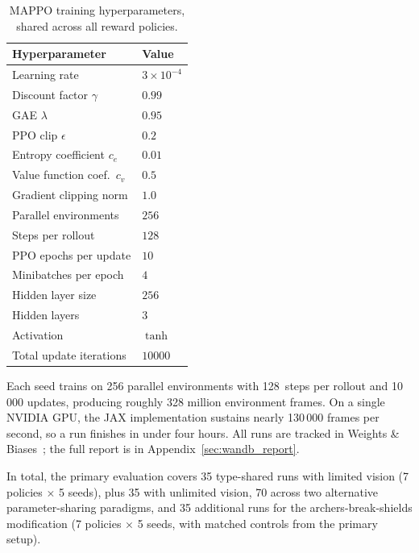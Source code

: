 \begin{table}[h]
  \centering
  \begin{tabular}{ll}
    \toprule
    \textbf{Hyperparameter} & \textbf{Value} \\
    \midrule
    Learning rate               & $3 \times 10^{-4}$ \\
    Discount factor $\gamma$    & $0.99$ \\
    GAE $\lambda$               & $0.95$ \\
    PPO clip $\epsilon$         & $0.2$ \\
    Entropy coefficient $c_e$   & $0.01$ \\
    Value function coef.\ $c_v$ & $0.5$ \\
    Gradient clipping norm      & $1.0$ \\
    Parallel environments       & $256$ \\
    Steps per rollout           & $128$ \\
    PPO epochs per update       & $10$ \\
    Minibatches per epoch       & $4$ \\
    Hidden layer size           & $256$ \\
    Hidden layers               & $3$ \\
    Activation                  & $\tanh$ \\
    Total update iterations     & $10000$ \\
    \bottomrule
  \end{tabular}
  \caption[MAPPO training hyperparameters.]{MAPPO training hyperparameters, shared across all reward policies.}
  \label{tab:hyperparams}
\end{table}

Each seed trains on 256 parallel environments with 128~steps per rollout and 10\,000 updates, producing roughly 328 million environment frames. On a single NVIDIA GPU, the JAX implementation sustains nearly 130\,000 frames per second, so a run finishes in under four hours. All runs are tracked in Weights \& Biases~\cite{wandb2020}; the full report is in Appendix~\ref{sec:wandb_report}.

In total, the primary evaluation covers 35 type-shared runs with limited vision (7 policies $\times$ 5 seeds), plus 35 with unlimited vision, 70 across two alternative parameter-sharing paradigms, and 35 additional runs for the archers-break-shields modification (7 policies $\times$ 5 seeds, with matched controls from the primary setup).

